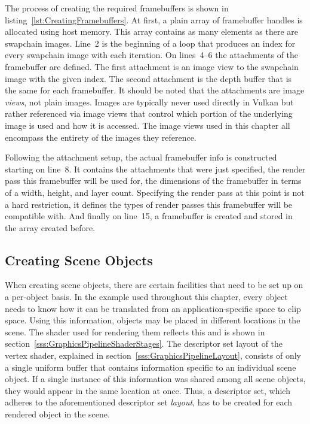       The process of creating the required framebuffers is shown in listing~\ref{lst:CreatingFramebuffers}.
      At first, a plain array of framebuffer handles is allocated using host memory.
      This array contains as many elements as there are swapchain images.
      Line~2 is the beginning of a loop that produces an index for every swapchain image with each iteration.
      On lines~4--6 the attachments of the framebuffer are defined.
      The first attachment is an image view to the swapchain image with the given index.
      The second attachment is the depth buffer that is the same for each framebuffer.
      It should be noted that the attachments are image \textit{views}, not plain images.
      Images are typically never used directly in Vulkan but rather referenced via image views that control which portion of the underlying image is used and how it is accessed.
      The image views used in this chapter all encompass the entirety of the images they reference.

      Following the attachment setup, the actual framebuffer info is constructed starting on line~8.
      It contains the attachments that were just specified, the render pass this framebuffer will be used for, the dimensions of the framebuffer in terms of a width, height, and layer count.
      Specifying the render pass at this point is not a hard restriction, it defines the types of render passes this framebuffer will be compatible with.
      And finally on line~15, a framebuffer is created and stored in the array created before.

    \subsection{Creating Scene Objects}
    \label{sss:CreatingSceneObjects}

      When creating scene objects, there are certain facilities that need to be set up on a per-object basis.
      In the example used throughout this chapter, every object needs to know how it can be translated from an application-specific space to clip space.
      Using this information, objects may be placed in different locations in the scene.
      The shader used for rendering them reflects this and is shown in section~\ref{sss:GraphicsPipelineShaderStages}.
      The descriptor set layout of the vertex shader, explained in section~\ref{sss:GraphicsPipelineLayout}, consists of only a single uniform buffer that contains information specific to an individual scene object.
      If a single instance of this information was shared among all scene objects, they would appear in the same location at once.
      Thus, a descriptor set, which adheres to the aforementioned descriptor set \textit{layout}, has to be created for each rendered object in the scene.

